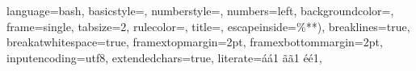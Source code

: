 \documentclass[
	11pt, %
	french, %
	singlespacing, %
	headsepline, %
	]{MastersDoctoralThesis} %
\author{
		Alain \textsc{Ait-Ali} \\
		Martin \textsc{Laporte} \\
		Clément \textsc{Ailloud} \\
		Romain \textsc{Petit}} %
\begin{document}
	
	\frontmatter %
	
	\pagestyle{plain} %
	
	
	
	\lstset
	{
    	language=bash, %
    	basicstyle=\ttfamily\small,
    	numberstyle=\footnotesize,
    	numbers=left,
    	backgroundcolor=\color{gray!10},
    	frame=single,
    	tabsize=2,
    	rulecolor=\color{black!30},
    	title=\lstname,
	    escapeinside={\%*}{*)},
	    breaklines=true,
	    breakatwhitespace=true,
	    framextopmargin=2pt,
	    framexbottommargin=2pt,
	    inputencoding=utf8,
	    extendedchars=true,
	    literate={á}{{\'a}}1 {ã}{{\~a}}1 {é}{{\'e}}1,
	}	
	
	
\end{document}
